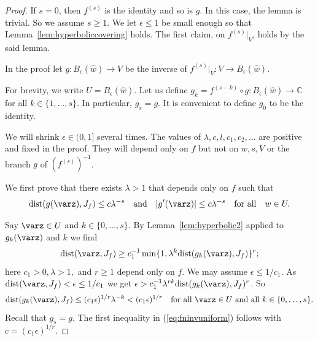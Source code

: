 \documentclass[12pt,oneside,a4]{amsart}
\newcommand{\IC}{\mathbb{C}}
\numberwithin{maincounter}{section}
\numberwithin{equation}{section}
\begin{document}
\begin{proof}
  If $s=0$, then $f^{(s)}$ is the identity and so is $g$. In this
  case, the lemma is trivial. So we assume $s\ge 1$. 
  We let $\epsilon \le 1$ be small enough so that 
  Lemma~\ref{lem:hyperboliccovering} holds.
  The first claim, on $f^{(s)}|_V$, holds by the said lemma.
  
  In the proof let
  $g\colon B_{\epsilon}(\widehat w)\rightarrow V$ be the inverse of
  $f^{(s)}|_V\colon V\rightarrow B_{\epsilon}(\widehat w)$.

  For brevity, we write $U = B_{\epsilon}(\widehat w)$. Let us define
  $g_k = f^{(s-k)}\circ g\colon B_{\epsilon}(\widehat w)\rightarrow \IC$
  for all $k\in \{1,\ldots,s\}$. In particular, $g_s=g$. It is
  convenient to define $g_0$ to be the identity.

  We will shrink $\epsilon\in (0,1]$ several times. The values of
  $\lambda,c,l,c_1,c_2,\ldots$ are positive and fixed in the proof. They
  will depend only on $f$ but not on $\widehat w,s,V$ or the branch
  $g$ of $(f^{(s)})^{-1}$.


  We first prove that there exists $\lambda > 1$
  that depends only on $f$
  such that
  \begin{equation}
    \label{eq:fninvuniform}
    \mathrm{dist}(g(\varz),J_f) \le c \lambda^{-s}
    \quad\text{and}\quad
    |g'(\varz)|\le c\lambda^{-s}
    \quad\text{for all}\quad w\in U. 
  \end{equation}


  Say $\varz\in U$ and $k\in \{0,\ldots,s\}$. By Lemma~\ref{lem:hyperbolic2}
  applied to $g_k(\varz)$ and $k$ we find
  \begin{equation*}
    \mathrm{dist}(\varz,J_f) \ge c_1^{-1}
    \min\{1,\lambda^k \mathrm{dist}(g_k(\varz),J_f)\}^r;   
  \end{equation*}
  here $c_1>0, \lambda > 1,$
  and $r\ge 1$ depend only on $f$.
  We may assume $\epsilon \le 1/c_1$. 
  As $\mathrm{dist}(\varz,J_f)<\epsilon\le 1/c_1$ we get
  $\epsilon >  c_1^{-1}
  \lambda^{rk} \mathrm{dist}(g_k(\varz),J_f)^r$.
  So 
  \begin{equation}
    \label{eq:gkapproaching}
    \mathrm{dist}(g_k(\varz),J_f) \le (c_1\epsilon)^{1/r} \lambda^{-k} < (c_1\epsilon)^{1/r}
    \quad\text{for all } \varz\in U\text{ and all }k\in
    \{0,\ldots,s\}. 
  \end{equation}
  Recall that $g_s=g$.
  The first inequality in 
  (\ref{eq:fninvuniform}) follows with
  $c = (c_1\epsilon)^{1/r}$.


\end{proof}
\end{document}
